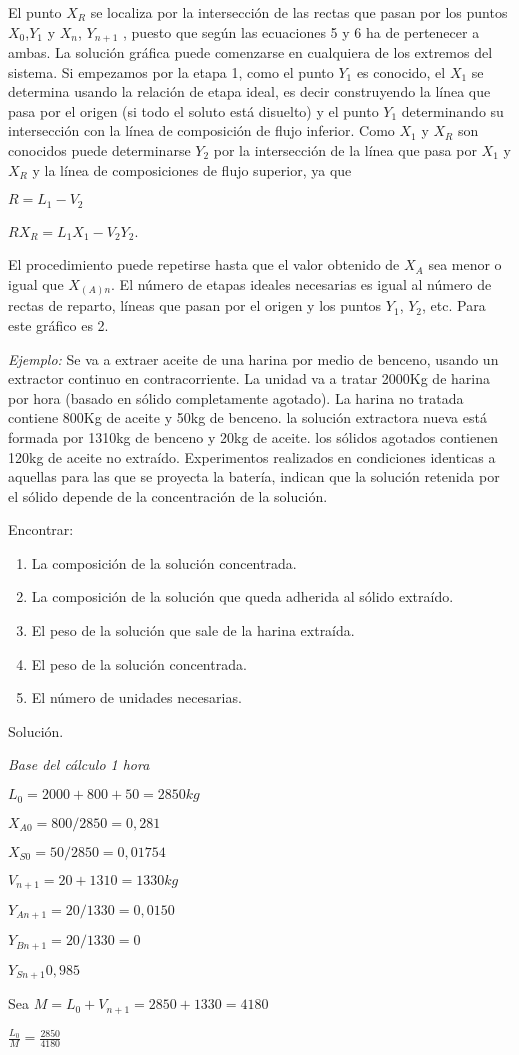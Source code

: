 \documentclass[12pt]{article}
\begin{document}
El punto $X_R$ se localiza por la intersección de las rectas que pasan por los puntos $X_0$,$Y_1$ y $X_n$, $Y_{n+1}$ , puesto que según las ecuaciones 5 y 6 ha de pertenecer a ambas.
La solución gráfica puede comenzarse en cualquiera de los extremos del sistema. Si empezamos por la etapa 1, como el punto $Y_1$ es conocido, el $X_1$ se determina usando la relación de etapa ideal, es decir construyendo la línea que pasa por el origen (si todo el soluto está disuelto) y el punto $Y_1$ determinando su intersección con la línea de composición de flujo inferior. Como $X_1$ y $X_R$ son conocidos puede determinarse $Y_2$ por la intersección de la línea que pasa por $X_1$ y $X_R$ y la línea de composiciones de flujo superior, ya que
 
$R=L_1 -V_2$

$R X_R = L_1 X_1 - V_2 Y_2$.

El procedimiento puede repetirse hasta que el valor obtenido de $X_A$ sea menor o igual que $X_{(A)n}$. El número de etapas ideales necesarias es igual al número de rectas de reparto, líneas que pasan por el origen y los puntos $Y_1$, $Y_2$, etc. Para este gráfico es 2.

\textit{Ejemplo:} Se va a extraer aceite de una harina por medio de benceno, usando un extractor continuo en contracorriente. La unidad va a tratar 2000Kg de harina por hora (basado en sólido completamente agotado). La harina no tratada contiene 800Kg de aceite y 50kg de benceno. la solución extractora nueva está formada por 1310kg de benceno y 20kg de aceite. los sólidos agotados contienen 120kg de aceite no extraído. Experimentos realizados en condiciones identicas a aquellas para las que se proyecta la batería, indican que la solución retenida por el sólido depende de la concentración de la solución.

Encontrar:

\begin{enumerate}[label=\alph*)]
\item La composición de la solución concentrada. 
\item La composición de la solución que queda adherida al sólido extraído.
\item El peso de la solución que sale de la harina extraída.
\item El peso de la solución concentrada.
\item El número de unidades necesarias.
\end{enumerate}

Solución.

\textit{Base del cálculo 1 hora}

$L_0=2000+800+50 = 2850kg$

$X_{A0}=800/2850=0,281$

$X_{S0}=50/2850=0,01754$

$V_{n+1}=20+1310=1330 kg$

$Y_{A n+1}=20/1330=0,0150$

$Y_{B n+1}=20/1330=0$

$Y_{S n+1}0,985$

Sea $M = L_0+V_{n+1}=2850+1330 =4180$

$\frac{L_0}{M} = \frac{2850}{4180}$
\end{document}
